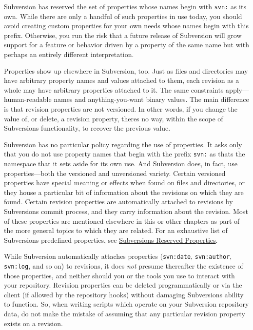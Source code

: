 Subversion has reserved the set of properties whose names begin with
\texttt{svn:} as its own. While there are only a handful of such
properties in use today, you should avoid creating custom properties for
your own needs whose names begin with this prefix. Otherwise, you run
the risk that a future release of Subversion will grow support for a
feature or behavior driven by a property of the same name but with
perhaps an entirely different interpretation.

Properties show up elsewhere in Subversion, too. Just as files and
directories may have arbitrary property names and values attached to
them, each revision as a whole may have arbitrary properties attached to
it. The same constraints apply---human-readable names and
anything-you-want binary values. The main difference is that revision
properties are not versioned. In other words, if you change the value
of, or delete, a revision property, there\textquotesingle s no way,
within the scope of Subversion\textquotesingle s functionality, to
recover the previous value.

Subversion has no particular policy regarding the use of properties. It
asks only that you do not use property names that begin with the prefix
\texttt{svn:} as that\textquotesingle s the namespace that it sets aside
for its own use. And Subversion does, in fact, use properties---both the
versioned and unversioned variety. Certain versioned properties have
special meaning or effects when found on files and directories, or they
house a particular bit of information about the revisions on which they
are found. Certain revision properties are automatically attached to
revisions by Subversion\textquotesingle s commit process, and they carry
information about the revision. Most of these properties are mentioned
elsewhere in this or other chapters as part of the more general topics
to which they are related. For an exhaustive list of
Subversion\textquotesingle s predefined properties, see
\hyperref[svn.advanced.props.ref]{Subversion\textquotesingle s Reserved
Properties}.

While Subversion automatically attaches properties (\texttt{svn:date},
\texttt{svn:author}, \texttt{svn:log}, and so on) to revisions, it does
\emph{not} presume thereafter the existence of those properties, and
neither should you or the tools you use to interact with your
repository. Revision properties can be deleted programmatically or via
the client (if allowed by the repository hooks) without damaging
Subversion\textquotesingle s ability to function. So, when writing
scripts which operate on your Subversion repository data, do not make
the mistake of assuming that any particular revision property exists on
a revision.


